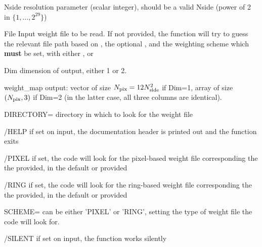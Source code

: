 \begin{qualifiers}
  \begin{qulist}{} %
    \item[Nside\mytarget{idl:unfold_weights:nside}] \healpix resolution parameter (scalar integer),
         should be a valid Nside (power of 2 in $\{1,\ldots,2^{29}\}$)
    \item[File\mytarget{idl:unfold_weights:file}] Input weight file to be read. If not provided, 
the function will try to guess the relevant file path based on 
, 
the optional , 
and the weighting scheme which \textbf{must} be set, with either
, 
 or 
    \item[Dim\mytarget{idl:unfold_weights:dim}] dimension of output, either 1 or 2. 
    \item[weight\_map\mytarget{idl:unfold_weights:weight_map}] output: vector of size $N_{\mathrm{pix}}=12N_{\mathrm{side}}^2$ if Dim=1, array of size $(N_{\mathrm{pix}},3)$ if Dim=2 (in the latter case, all three columns are identical).
  \end{qulist}
\end{qualifiers}

\begin{keywords}
  \begin{kwlist}{} %
    \item[DIRECTORY=\mytarget{idl:unfold_weights:directory}] 
    directory in which to look for the weight file 
    \item[/HELP\mytarget{idl:unfold_weights:help}] if set on input, the documentation header 
  is printed out and the function exits
    \item[/PIXEL\mytarget{idl:unfold_weights:pixel}] if set, the code will look for the pixel-based weight file corresponding the the  provided, in the default or provided 
    \item[/RING\mytarget{idl:unfold_weights:ring}] if set, the code will look for the ring-based weight file corresponding the the  provided, in the default or provided
    \item[SCHEME=\mytarget{idl:unfold_weights:scheme}] can be either 'PIXEL' or 'RING', setting the type of weight file the code will look for.
    \item[/SILENT\mytarget{idl:unfold_weights:silent}] if set on input, the function works silently
  \end{kwlist}
\end{keywords}  

